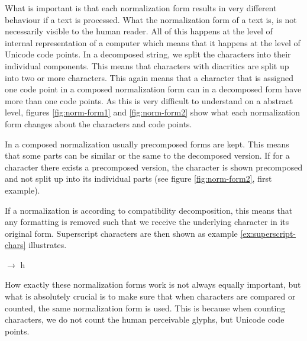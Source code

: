 What is important is that each normalization form results in very different behaviour if a text is processed. What the normalization form of a text is, is not necessarily visible to the human reader. All of this happens at the level of internal representation of a computer which means that it happens at the level of Unicode code points. In a decomposed string, we split the characters into their individual components. This means that characters with diacritics are split up into two or more characters. This again means that a character that is assigned one code point in a composed normalization form can in a decomposed form have more than one code points. As this is very difficult to understand on a abstract level, figures \ref{fig:norm-form1} and \ref{fig:norm-form2} show what each normalization form changes about the characters and code points.


In a composed normalization usually precomposed forms are kept. This means that some parts can be similar or the same to the decomposed version. If for a character there exists a precomposed version, the character is shown precomposed and not split up into its individual parts (see figure \ref{fig:norm-form2}, first example). 

If a normalization is according to compatibility decomposition, this means that any formatting is removed such that we receive the underlying character in its original form. Superscript characters are then shown as example \ref{ex:superscript-chars} illustrates. 

\begin{covexamples}
\label{ex:superscript-chars}
\item {} $\rightarrow$ h
\end{covexamples}


How exactly these normalization forms work is not always equally important, but what is absolutely crucial is to make sure that when characters are compared or counted, the same normalization form is used. This is because when counting characters, we do not count the human perceivable glyphs, but Unicode code points.  

